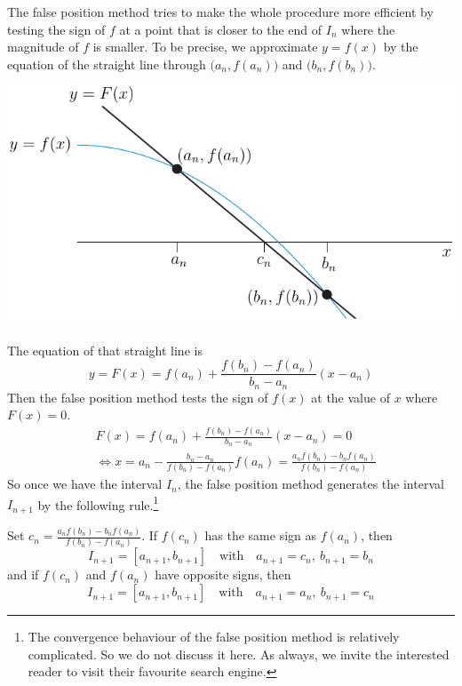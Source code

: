 The false position method tries to make the whole procedure more efficient by testing the sign of $f$ at a point that is closer to the end of $I_n$ where the magnitude of $f$ is smaller.
 To be precise, we approximate $y=f(x)$ by the equation of the straight line through $\big(a_n,f(a_n)\big)$ and $\big(b_n,f(b_n)\big)$.   
\begin{efig}
\begin{center}
   \includegraphics{falsePosition}
\end{center}
\end{efig}
The equation of that straight line is
\begin{equation*}
y = F(x) = f(a_n) + \frac{f(b_n)-f(a_n)}{b_n-a_n}(x-a_n)
\end{equation*}
Then the false position method tests the sign of $f(x)$ at the value of 
$x$ where $F(x)=0$.
\begin{align*}
&F(x) = f(a_n) + \frac{f(b_n)-f(a_n)}{b_n-a_n}(x-a_n)
  =0 \\
& \iff x= a_n - \frac{b_n-a_n}{f(b_n)-f(a_n)} f(a_n)
           = \frac{a_n f(b_n) - b_n f(a_n) }{f(b_n)-f(a_n)}
\end{align*}
So once we have the interval $I_n$, the false position method generates the interval $I_{n+1}$ by the following rule.\footnote{The convergence behaviour of the false position method is relatively complicated. So we do not discuss 
it here. As always, we invite the interested reader to visit their favourite search engine.}
\begin{impeqn}\label{eq:APPfalsePosition}
Set $c_n=\frac{a_n f(b_n) - b_n f(a_n) }{f(b_n)-f(a_n)}$. 
If $f(c_n)$ has the same sign as $f(a_n)$, then
  \begin{equation*}
    I_{n+1}=[a_{n+1},b_{n+1}]\quad\text{with}\quad
               a_{n+1}=c_n,\  b_{n+1}=b_n
  \end{equation*}
and if 
$f(c_n)$ and $f(a_n)$ have opposite signs, then
  \begin{equation*}
    I_{n+1}=[a_{n+1},b_{n+1}]\quad\text{with}\quad
             a_{n+1}=a_n,\  b_{n+1}=c_n
  \end{equation*}
\end{impeqn}


